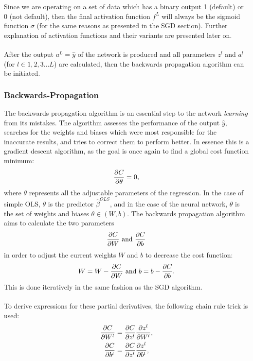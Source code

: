             Since we are operating on a set of data which has a binary output 1 (default) or 0 (not default), then the final activation function $f^L$ will always be the sigmoid function $\sigma$ (for the same reasons as presented in the SGD section). Further explanation of activation functions and their variants are presented later on.\\\\
            After the output $a^L=\hat{y}$ of the network is produced and all parameters $z^l$ and $a^l$ (for $l\in 1, 2, 3 \hdots L$) are calculated, then the backwards propagation algorithm can be initiated.
        
        \subsubsection{Backwards-Propagation}
            The backwards propagation algorithm is an essential step to the network \textit{learning} from its mistakes. The algorithm assesses the performance of the output $\hat{y}$, searches for the weights and biases which were most responsible for the inaccurate results, and tries to correct them to perform better. In essence this is a gradient descent algorithm, as the goal is once again to find a global cost function minimum:
            \begin{equation}
                \pdv{C}{\theta} = 0,
            \end{equation}
            where $\theta$ represents all the adjustable parameters of the regression. In the case of simple OLS, $\theta$ is the predictor $\hat{\beta}^{OLS}$, and in the case of the neural network, $\theta$ is the set of weights and biases $\theta \in (W, b)$. The backwards propagation algorithm aims to calculate the two parameters
            \begin{equation}
                \pdv{C}{W} \text{ and } \pdv{C}{b}
            \end{equation}
            in order to adjust the current weights $W$ and $b$ to decrease the cost function:
            \begin{equation}
                W = W - \pdv{C}{W} \text{ and } b = b - \pdv{C}{b}.
            \end{equation}
            This is done iteratively in the same fashion as the SGD algorithm.\\\\
            To derive expressions for these partial derivatives, the following chain rule trick is used:
            \begin{align}\label{eq:NNWdC/dW}
                \pdv{C}{W^l} &= \pdv{C}{z^l}\pdv{z^l}{W^l},\\\label{eq:NNWdC/db}
                \pdv{C}{b^l} &= \pdv{C}{z^l}\pdv{z^l}{b^l},
            \end{align}
